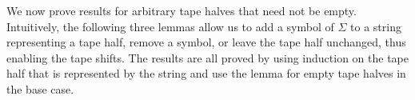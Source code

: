 

We now prove results for arbitrary tape halves that need not be empty. 
Intuitively, the following three lemmas allow us to add a symbol of $\Sigma$ to a string representing a tape half, remove a symbol, or leave the tape half unchanged, thus enabling the tape shifts.
The results are all proved by using induction on the tape half that is represented by the string and use the lemma for empty tape halves in the base case. 

